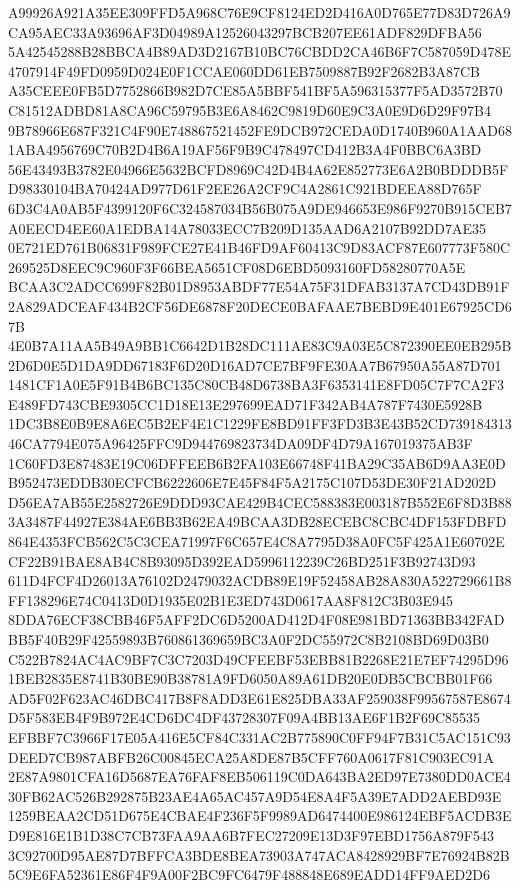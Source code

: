 \documentclass[UTF8,fontset=fandol,zihao=-4,a4paper]{ctexart}
\begin{document}
{{A99926A921A35EE309FFD5A968C76E9CF8124ED2D416A0D765E77D83D726A9CA95AEC33A93696AF3D04989A12526043297BCB207EE61ADF829DFBA56
5A42545288B28BBCA4B89AD3D2167B10BC76CBDD2CA46B6F7C587059D478E4707914F49FD0959D024E0F1CCAE060DD61EB7509887B92F2682B3A87CB
A35CEEE0FB5D7752866B982D7CE85A5BBF541BF5A596315377F5AD3572B70C81512ADBD81A8CA96C59795B3E6A8462C9819D60E9C3A0E9D6D29F97B4
9B78966E687F321C4F90E748867521452FE9DCB972CEDA0D1740B960A1AAD681ABA4956769C70B2D4B6A19AF56F9B9C478497CD412B3A4F0BBC6A3BD
56E43493B3782E04966E5632BCFD8969C42D4B4A62E852773E6A2B0BDDDB5FD98330104BA70424AD977D61F2EE26A2CF9C4A2861C921BDEEA88D765F
6D3C4A0AB5F4399120F6C324587034B56B075A9DE946653E986F9270B915CEB7A0EECD4EE60A1EDBA14A78033ECC7B209D135AAD6A2107B92DD7AE35
0E721ED761B06831F989FCE27E41B46FD9AF60413C9D83ACF87E607773F580C269525D8EEC9C960F3F66BEA5651CF08D6EBD5093160FD58280770A5E
BCAA3C2ADCC699F82B01D8953ABDF77E54A75F31DFAB3137A7CD43DB91F2A829ADCEAF434B2CF56DE6878F20DECE0BAFAAE7BEBD9E401E67925CD67B
4E0B7A11AA5B49A9BB1C6642D1B28DC111AE83C9A03E5C872390EE0EB295B2D6D0E5D1DA9DD67183F6D20D16AD7CE7BF9FE30AA7B67950A55A87D701
1481CF1A0E5F91B4B6BC135C80CB48D6738BA3F6353141E8FD05C7F7CA2F3E489FD743CBE9305CC1D18E13E297699EAD71F342AB4A787F7430E5928B
1DC3B8E0B9E8A6EC5B2EF4E1C1229FE8BD91FF3FD3B3E43B52CD73918431346CA7794E075A96425FFC9D944769823734DA09DF4D79A167019375AB3F
1C60FD3E87483E19C06DFFEEB6B2FA103E66748F41BA29C35AB6D9AA3E0DB952473EDDB30ECFCB6222606E7E45F84F5A2175C107D53DE30F21AD202D
D56EA7AB55E2582726E9DDD93CAE429B4CEC588383E003187B552E6F8D3B883A3487F44927E384AE6BB3B62EA49BCAA3DB28ECEBC8CBC4DF153FDBFD
864E4353FCB562C5C3CEA71997F6C657E4C8A7795D38A0FC5F425A1E60702ECF22B91BAE8AB4C8B93095D392EAD5996112239C26BD251F3B92743D93
611D4FCF4D26013A76102D2479032ACDB89E19F52458AB28A830A522729661B8FF138296E74C0413D0D1935E02B1E3ED743D0617AA8F812C3B03E945
8DDA76ECF38CBB46F5AFF2DC6D5200AD412D4F08E981BD71363BB342FADBB5F40B29F42559893B760861369659BC3A0F2DC55972C8B2108BD69D03B0
C522B7824AC4AC9BF7C3C7203D49CFEEBF53EBB81B2268E21E7EF74295D961BEB2835E8741B30BE90B38781A9FD6050A89A61DB20E0DB5CBCBB01F66
AD5F02F623AC46DBC417B8F8ADD3E61E825DBA33AF259038F99567587E8674D5F583EB4F9B972E4CD6DC4DF43728307F09A4BB13AE6F1B2F69C85535
EFBBF7C3966F17E05A416E5CF84C331AC2B775890C0FF94F7B31C5AC151C93DEED7CB987ABFB26C00845ECA25A8DE87B5CFF760A0617F81C903EC91A
2E87A9801CFA16D5687EA76FAF8EB506119C0DA643BA2ED97E7380DD0ACE430FB62AC526B292875B23AE4A65AC457A9D54E8A4F5A39E7ADD2AEBD93E
1259BEAA2CD51D675E4CBAE4F236F5F9989AD6474400E986124EBF5ACDB3ED9E816E1B1D38C7CB73FAA9AA6B7FEC27209E13D3F97EBD1756A879F543
3C92700D95AE87D7BFFCA3BDE8BEA73903A747ACA8428929BF7E76924B82B5C9E6FA52361E86F4F9A00F2BC9FC6479F488848E689EADD14FF9AED2D6
}}
\end{document}
